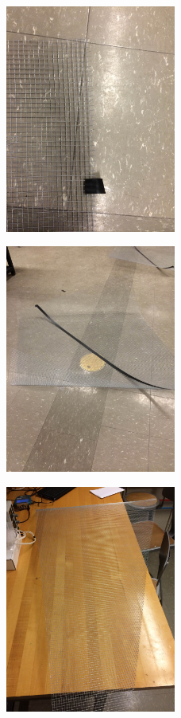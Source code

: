 \documentclass[11pt]{article} %
\begin{document}
\begin{figure}
  \centering
  \caption{   }
  \includegraphics[width=0.50\textwidth]{dish/09.jpeg}
\end{figure}

\begin{figure}
  \centering
  \caption{   }
  \includegraphics[width=0.50\textwidth]{dish/10.jpeg}
\end{figure}

\begin{figure}
  \centering
  \caption{   }
  \includegraphics[width=0.50\textwidth]{dish/11.jpeg}
\end{figure}
\end{document}
